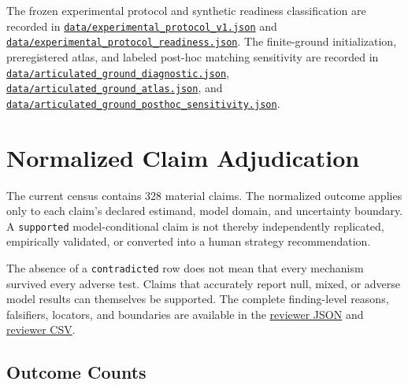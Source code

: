 \documentclass[
  letterpaper,
]{report}
\begin{document}
The frozen experimental protocol and synthetic readiness classification
are recorded in
\href{https://github.com/D-sorganization/UpstreamDrift/blob/main/docs/research/proximal_distal_energy_transfer/data/experimental_protocol_v1.json}{\texttt{data/experimental\_protocol\_v1.json}}
and
\href{https://github.com/D-sorganization/UpstreamDrift/blob/main/docs/research/proximal_distal_energy_transfer/data/experimental_protocol_readiness.json}{\texttt{data/experimental\_protocol\_readiness.json}}.
The finite-ground initialization, preregistered atlas, and labeled
post-hoc matching sensitivity are recorded in
\href{https://github.com/D-sorganization/UpstreamDrift/blob/main/docs/research/proximal_distal_energy_transfer/data/articulated_ground_diagnostic.json}{\texttt{data/articulated\_ground\_diagnostic.json}},
\href{https://github.com/D-sorganization/UpstreamDrift/blob/main/docs/research/proximal_distal_energy_transfer/data/articulated_ground_atlas.json}{\texttt{data/articulated\_ground\_atlas.json}},
and
\href{https://github.com/D-sorganization/UpstreamDrift/blob/main/docs/research/proximal_distal_energy_transfer/data/articulated_ground_posthoc_sensitivity.json}{\texttt{data/articulated\_ground\_posthoc\_sensitivity.json}}.

\section{Normalized Claim
Adjudication}\label{normalized-claim-adjudication}

The current census contains 328 material claims. The normalized outcome
applies only to each claim's declared estimand, model domain, and
uncertainty boundary. A \texttt{supported} model-conditional claim is
not thereby independently replicated, empirically validated, or
converted into a human strategy recommendation.

The absence of a \texttt{contradicted} row does not mean that every
mechanism survived every adverse test. Claims that accurately report
null, mixed, or adverse model results can themselves be supported. The
complete finding-level reasons, falsifiers, locators, and boundaries are
available in the
\href{https://github.com/D-sorganization/UpstreamDrift/blob/main/docs/research/proximal_distal_energy_transfer/data/claim_adjudication_summary.json}{reviewer
JSON} and
\href{https://github.com/D-sorganization/UpstreamDrift/blob/main/docs/research/proximal_distal_energy_transfer/data/claim_adjudication_summary.csv}{reviewer
CSV}.

\subsection{Outcome Counts}\label{outcome-counts}
\end{document}
